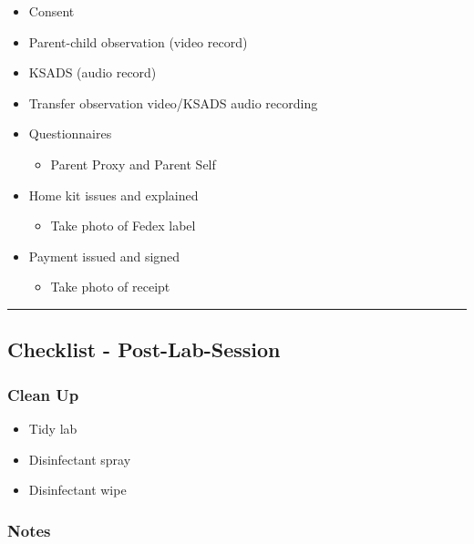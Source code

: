 \documentclass[]{book}
\providecommand{\tightlist}{%
  \setlength{\itemsep}{0pt}\setlength{\parskip}{0pt}}
\begin{document}
\begin{itemize}
\tightlist
\item
  Consent
\item
  Parent-child observation (video record)
\item
  KSADS (audio record)
\item
  Transfer observation video/KSADS audio recording
\item
  Questionnaires

  \begin{itemize}
  \tightlist
  \item
    Parent Proxy and Parent Self
  \end{itemize}
\item
  Home kit issues and explained

  \begin{itemize}
  \tightlist
  \item
    Take photo of Fedex label
  \end{itemize}
\item
  Payment issued and signed

  \begin{itemize}
  \tightlist
  \item
    Take photo of receipt
  \end{itemize}
\end{itemize}

\begin{center}\rule{0.5\linewidth}{0.5pt}\end{center}

\hypertarget{checklist---post-lab-session}{%
\subsection{Checklist - Post-Lab-Session}\label{checklist---post-lab-session}}

\hypertarget{clean-up}{%
\subsubsection{Clean Up}\label{clean-up}}

\begin{itemize}
\tightlist
\item
  Tidy lab
\item
  Disinfectant spray
\item
  Disinfectant wipe
\end{itemize}

\hypertarget{notes}{%
\subsubsection{Notes}\label{notes}}
\end{document}
